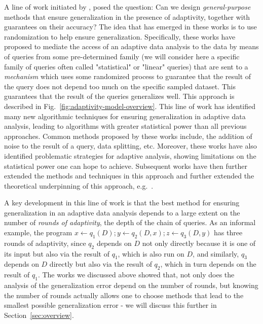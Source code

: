 A line of work initiated by \cite{DworkFHPRR15}, \cite{HardtU14} posed the question: Can we design \emph{general-purpose} methods that ensure generalization in the presence of adaptivity, together with guarantees on their accuracy?  
The idea that has emerged in these works is to use randomization to help ensure generalization. 
Specifically, these works have proposed to mediate the access of an adaptive data analysis to the data by means of queries from some pre-determined family (we will consider here a specific family of queries often called "statistical" or "linear" queries) that are sent to a  \emph{mechanism} which uses some randomized process to guarantee that the result of the query does not depend too much on the specific
sampled dataset. 
This guarantees that the result of the queries generalizes well. This approach is described in Fig.~\ref{fig:adaptivity-model-overview}.  
This line of work has identified many new algorithmic techniques for ensuring generalization in adaptive data analysis, leading to algorithms with greater statistical power than all previous approaches. Common methods proposed by these works include, the addition of noise to the result of a query, data splitting, etc. Moreover, these works have also identified problematic strategies for adaptive analysis, showing limitations on the statistical power one can hope to achieve. Subsequent works have then further extended the methods and techniques in this approach and further extended the theoretical underpinning of this approach, e.g.~\cite{dwork2015reusable,dwork2015generalization,BassilyNSSSU16,UllmanSNSS18,FeldmanS17,jung2019new,SteinkeZ20,RogersRSSTW20}.

A key development in this line of work is that the best method for ensuring generalization in an adaptive data analysis depends to a large extent on the number of \emph{rounds of adaptivity}, the depth of the chain of queries. 
As an informal example, the program $x \leftarrow q_1(D);y \leftarrow q_2(D,x);z \leftarrow q_3(D,y)$ has three rounds of adaptivity, since $q_2$  depends on $D$ not only directly because it is one of its input but also via the result of $q_1$, which is also run on $D$, and similarly,  $q_3$ depends on $D$ directly but also via the result of $q_2$, which in turn depends on the result of $q_1$.
The works we discussed above showed that, not only does the analysis of the generalization error depend on the number of rounds, but knowing the number of rounds actually allows one to choose methods that lead to the smallest possible generalization error - we will discuss this further in Section~\ref{sec:overview}. 

